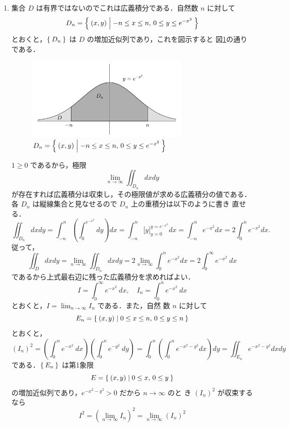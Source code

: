 \documentclass[11pt, uplatex, dvipdfmx]{jsarticle}
\newcommand{\ds}{\displaystyle}
\begin{document}
\begin{enumerate}[(1)]
   \item 集合 $D$ は有界ではないのでこれは広義積分である．自然数 $n$ に対して
     \[
       D_n = \Set{ (x,y)  |  -n \leq x \leq n, \, 0 \leq y \leq e^{-x^2} }
     \]
     とおくと，$\Set{D_n}$ は $D$ の増加近似列であり，これを図示すると
     図\ref{fig:no22}の通りである．
          \begin{figure}[h]
       \centering
       \includegraphics[height=4cm]{./pictures/no22.pdf}
       \caption{ $D_n=\Set{(x,y)  |  -n \leq x \leq n, \, 0 \leq y \leq e^{-x^2} }$}\label{fig:no22}
     \end{figure}
     $1 \geq0$ であるから，極限
     \[
       \lim_{n \to \infty} \iint_{D_n} dx dy
     \]
     が存在すれば広義積分は収束し，その極限値が求める広義積分の値である．
     各 $D_n$ は縦線集合と見なせるので $D_n$ 上の重積分は以下のように書き
     直せる．
     \[
       \iint_{D_n} dx dy = \int_{-n}^{n} \left( \int_{0}^{e^{-x^2}} dy \right) dx
       = \int_{-n}^{n} \Big[ y \Big]_{y=0}^{y=e^{-x^2}} dx 
       = \int_{-n}^{n} e^{-x^2} dx = 2 \int_{0}^{n} e^{-x^2} dx.
     \]
     従って，
     \[
       \iint_D dxdy = \lim_{n \to \infty} \iint_{D_n} dx dy = 2 \lim_{n \to \infty} \int_{0}^{n} e^{-x^2} dx
       = 2 \int_{0}^{\infty} e^{-x^2} \ dx 
     \]
     であるから上式最右辺に残った広義積分を求めればよい．
     \[
       I=\int_{0}^{\infty} e^{-x^2} \ dx, \quad I_n = \int_{0}^{n} e^{-x^2} \ dx
     \]
     とおくと，$\ds I=\lim_{n \to \infty} I_n$ である．また，自然
     数 $n$ に対して
     \[
       E_n =\Set{ (x,y) | 0 \leq x \leq n, \, 0 \leq y \leq n}
     \]
     とおくと，
     \[
       \left(I_n\right)^2 
       = \left( \int_{0}^{n} e^{-x^2} \ dx \right) \left( \int_{0}^{n} e^{-y^2} \ dy\right)
         = \int_{0}^{n} \left( \int_{0}^{n} e^{-x^2-y^2} dx \right) dy
         = \iint_{E_n} e^{-x^2-y^2} dx dy
     \]
     である．$\Set{ E_n}$ は第1象限
     \[
       E=\Set{(x,y) | 0 \leq x, \, 0 \leq y}
     \]
     の増加近似列であり，$e^{-x^2-y^2}>0$ だから $n \to \infty$ のと
     き $\left( I_n\right)^2$ が収束するなら
     \[
       I^2 = \left( \lim_{n \to \infty} I_n\right)^2 =\lim_{n \to \infty} \left( I_n\right)^2 
\]
\end{enumerate}
\end{document}
